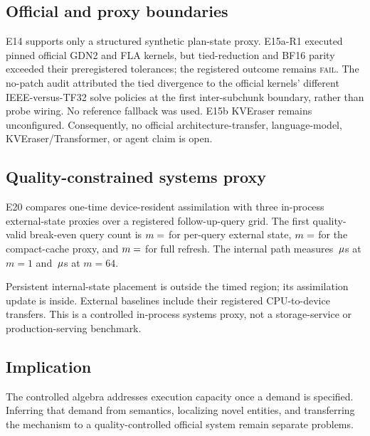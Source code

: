 \subsection{Official and proxy boundaries}

E14 supports only a structured synthetic plan-state proxy.  E15a-R1 executed
pinned official GDN2 and FLA kernels, but tied-reduction and BF16 parity
exceeded their preregistered tolerances; the registered outcome remains
\textsc{fail}.  The no-patch audit attributed the tied divergence to the
official kernels' different IEEE-versus-TF32 solve policies at the first
inter-subchunk boundary, rather than probe wiring.  No reference fallback was
used.  E15b KVEraser remains unconfigured.  Consequently, no official
architecture-transfer, language-model, KVEraser/Transformer, or agent claim
is open.

\subsection{Quality-constrained systems proxy}

E20 compares one-time device-resident assimilation with three in-process
external-state proxies over a registered follow-up-query grid.  The first
quality-valid break-even query count is
$m=\CATENAResult{E20_BREAK_EVEN_EXTERNAL_PER_QUERY}$ for per-query external
state, $m=\CATENAResult{E20_BREAK_EVEN_COMPACT_CACHE}$ for the compact-cache
proxy, and $m=\CATENAResult{E20_BREAK_EVEN_FULL_REFRESH}$ for full refresh.
The internal path measures
$\CATENAResult{E20_INTERNAL_M1_MICROSECONDS}\,\mu$s at $m=1$ and
$\CATENAResult{E20_INTERNAL_M64_MICROSECONDS}\,\mu$s at $m=64$.

Persistent internal-state placement is outside the timed region; its
assimilation update is inside.  External baselines include their registered
CPU-to-device transfers.  This is a controlled in-process systems proxy, not a
storage-service or production-serving benchmark.

\subsection{Implication}

The controlled algebra addresses execution capacity once a demand is
specified.  Inferring that demand from semantics, localizing novel entities,
and transferring the mechanism to a quality-controlled official system remain
separate problems.
